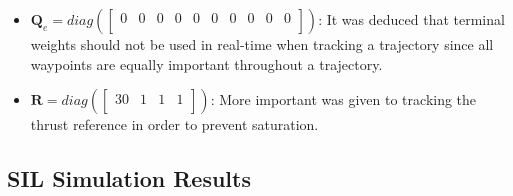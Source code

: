 \documentclass{thesisreport}
\begin{document}
\begin{itemize}
	\item $\bm{Q}_e = diag(
	\begin{bmatrix}
			0 & 0 & 0 & 0 & 0 & 0 & 0 & 0 & 0 & 0\\
	\end{bmatrix})$: It was deduced that terminal weights should not be used in real-time when tracking a trajectory since all waypoints are equally important throughout a trajectory.
	
	\item $\bm{R} =diag(
	\begin{bmatrix}
			30 & 1 & 1 & 1\\
	\end{bmatrix}) $: More important was given to tracking the thrust reference in order to prevent saturation.
\end{itemize}


\subsection{SIL Simulation Results}
\end{document}
